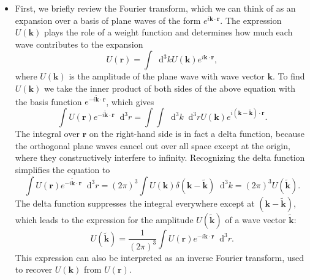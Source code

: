 \documentclass[11pt, a4paper]{article}
\newcommand{\diff}{\mathop{}\!\mathrm{d}} %
\renewcommand{\vec}[1]{\bm{#1}} %
\newcommand{\tvec}[1]{\tilde{\vec{#1}}} %
\renewcommand{\r}{\vec{r}}
\begin{document}
\begin{itemize}
	\item First, we briefly review the Fourier transform, which we can think of as an expansion over a basis of plane waves of the form $ e^{i \vec{k} \cdot \r} $. The expression $ U(\vec{k}) $ plays the role of a weight function and determines how much each wave contributes to the expansion
	\begin{equation*}
		U(\r) = \int \diff^{3}k U(\vec{k}) e^{i \vec{k}\cdot \r},
	\end{equation*}
	where $ U(\vec{k}) $ is the amplitude of the plane wave with wave vector $ \vec{k} $. To find $ U(\vec{k}) $ we take the inner product of both sides of the above equation with the basis function $ e^{-i \tvec{k}\cdot\r} $, which gives 
	\begin{equation*}
		\int U(\r) e^{-i \tvec{k}\cdot \r} \diff^{3}r = \int \int \diff^{3}k \diff^{3}r U(\vec{k}) e^{i (\vec{k} - \tvec{k})\cdot \r}.
	\end{equation*}
	The integral over $ \r $ on the right-hand side is in fact a delta function, because the orthogonal plane waves cancel out over all space except at the origin, where they constructively interfere to infinity. Recognizing the delta function simplifies the equation to
	\begin{equation*}
		\int U(\r) e^{-i \tvec{k}\cdot \r} \diff^{3}r = (2\pi)^{3} \int U(\vec{k}) \delta (\vec{k} - \tvec{k}) \diff^{3}k = (2\pi)^{3} U(\tvec{k}).
	\end{equation*}
	The delta function suppresses the integral everywhere except at $ (\vec{k} - \tvec{k}) $, which leads to the expression for the amplitude $ U(\tvec{k}) $ of a wave vector $ \tvec{k} $:
	\begin{equation*}
		U(\tvec{k}) = \frac{1}{(2\pi)^{3}} \int U(\r) e^{-i\vec{k}\cdot \r} \diff^{3}r.
	\end{equation*}
	This expression can also be interpreted as an inverse Fourier transform, used to recover $ U(\vec{k}) $ from $ U(\r) $.


\end{itemize}
\end{document}
